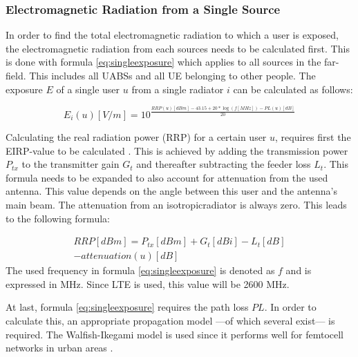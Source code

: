 \documentclass[twocolumn]{phdsymp} %
\begin{document}
\subsubsection{Electromagnetic Radiation from a Single Source}
\label{sec:calculatingexposure}

In order to find the total electromagnetic radiation to which a user is exposed, 
the electromagnetic radiation from each sources needs to be calculated first.
This is done with formula \ref{eq:singleexposure} which applies to all sources in the far-field.
This includes all \gls{UABS}s and all \gls{UE}  belonging to other people.
The exposure $E$ of a single user $u$ from a single radiator $i$ can be calculated
as follows:

\begin{equation}
E_i(u) [V/m] = 10^{\frac{RRP(u)[dBm] - 43.15 + 20*\log(f [MHz])- PL(u) [dB]}{20}}
\label{eq:singleexposure}
\end{equation}

Calculating the real radiation power (RRP) for a certain user $u$, requires first the \gls{EIRP}-value to be calculated  \cite{J6_originalExposureFormula,J1}.
This is achieved by adding the transmission power $P_{tx}$ to the transmitter gain $G_t$ and thereafter subtracting the feeder loss $L_t$.
This formula needs to be expanded to also account for attenuation from the used antenna. This value depends on the angle
between this user and the antenna's main beam. The attenuation from an \gls{isotropicradiator} is always zero. This leads to the following formula:

\begin{equation}
\begin{aligned}
RRP [dBm] = P_{tx} [dBm] + G_t [dBi]- L_t [dB]\\
     - attenuation(u) [dB]
\end{aligned}
\label{eq:eirp}
\end{equation}
The used frequency in formula \ref{eq:singleexposure} is denoted as $f$ and is expressed in MHz. Since \gls{LTE} is used, this value will be 2600 MHz.

At last, formula \ref{eq:singleexposure} requires the path loss $PL$. In order to calculate this, an appropriate propagation model ---of which several exist--- is required.
The Walfish-Ikegami model is used since it performs well for femtocell networks in urban areas \cite{J2}. %
\end{document}
